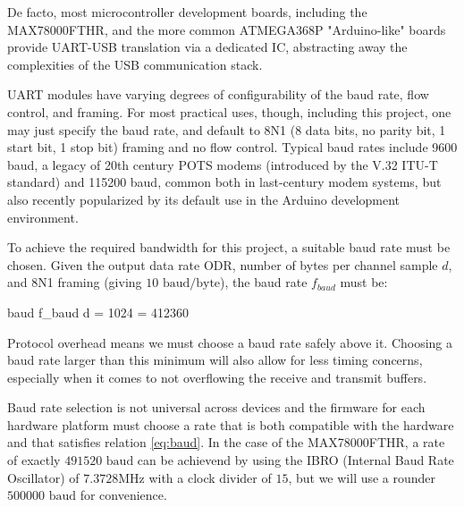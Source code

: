 \documentclass{thesis}
\newcommand{\Hz}{\unit{\hertz}}
\begin{document}
De facto, most microcontroller development boards, including the MAX78000FTHR, and the more common ATMEGA368P "Arduino-like" boards provide UART-USB translation via a dedicated IC, abstracting away the complexities of the USB communication stack.

UART modules have varying degrees of configurability of the baud rate, flow control, and framing. For most practical uses, though, including this project, one may just specify the baud rate, and default to 8N1 (8 data bits, no parity bit, 1 start bit, 1 stop bit) framing and no flow control. Typical baud rates include 9600 baud, a legacy of 20th century POTS modems (introduced by the V.32 ITU-T standard) and 115200 baud, common both in last-century modem systems, but also recently popularized by its default use in the Arduino development environment.

To achieve the required bandwidth for this project, a suitable baud rate must be chosen. Given the output data rate $\text{ODR}$, number of bytes per channel sample $d$, and 8N1 framing (giving $10\text{ baud}/\text{byte}$), the baud rate $f_{baud}$ must be:

\begin{thesisequation}{baud}
f_{baud} \geq {} \cdot d  = 1024    = 412360
\end{thesisequation}

Protocol overhead means we must choose a baud rate safely above it. Choosing a baud rate larger than this minimum will also allow for less timing concerns, especially when it comes to not overflowing the receive and transmit buffers.

Baud rate selection is not universal across devices and the firmware for each hardware platform must choose a rate that is both compatible with the hardware and that satisfies relation \ref{eq:baud}. In the case of the MAX78000FTHR, a rate of exactly $491520\text{ baud}$ can be achievend by using the IBRO (Internal Baud Rate Oscillator) of $7.3728\text{MHz}$ with a clock divider of $15$, but we will use a rounder $500000\text{ baud}$ for convenience.



\end{document}
